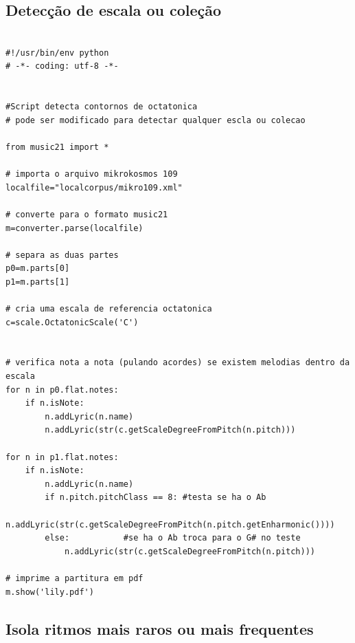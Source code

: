 \documentclass[
	12pt,				%
	openright,			%
	twoside,			%
	a4paper,			%
	english,			%
	french,				%
	spanish,			%
	brazil				%
	]{abntex2}
\begin{document}
\subsection{Detecção de escala ou coleção}

\begin{lstlisting}

#!/usr/bin/env python
# -*- coding: utf-8 -*-


#Script detecta contornos de octatonica
# pode ser modificado para detectar qualquer escla ou colecao

from music21 import *

# importa o arquivo mikrokosmos 109
localfile="localcorpus/mikro109.xml"

# converte para o formato music21
m=converter.parse(localfile)

# separa as duas partes
p0=m.parts[0]
p1=m.parts[1]

# cria uma escala de referencia octatonica
c=scale.OctatonicScale('C')


# verifica nota a nota (pulando acordes) se existem melodias dentro da escala
for n in p0.flat.notes:
	if n.isNote:
		n.addLyric(n.name)
		n.addLyric(str(c.getScaleDegreeFromPitch(n.pitch)))

for n in p1.flat.notes:
	if n.isNote:
		n.addLyric(n.name)
		if n.pitch.pitchClass == 8: #testa se ha o Ab
			n.addLyric(str(c.getScaleDegreeFromPitch(n.pitch.getEnharmonic())))			
		else:			#se ha o Ab troca para o G# no teste
			n.addLyric(str(c.getScaleDegreeFromPitch(n.pitch)))			
			
# imprime a partitura em pdf
m.show('lily.pdf')		
\end{lstlisting}

\subsection{Isola ritmos mais raros ou mais frequentes}
\end{document}
